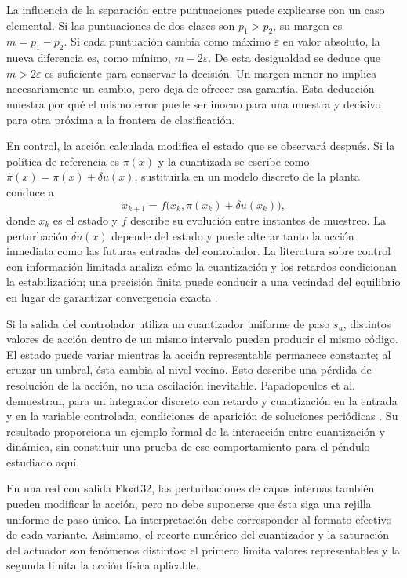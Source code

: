 La influencia de la separación entre puntuaciones puede explicarse con un caso elemental. Si las puntuaciones de dos clases son $p_1>p_2$, su margen es $m=p_1-p_2$. Si cada puntuación cambia como máximo $\varepsilon$ en valor absoluto, la nueva diferencia es, como mínimo, $m-2\varepsilon$. De esta desigualdad se deduce que $m>2\varepsilon$ es suficiente para conservar la decisión. Un margen menor no implica necesariamente un cambio, pero deja de ofrecer esa garantía. Esta deducción muestra por qué el mismo error puede ser inocuo para una muestra y decisivo para otra próxima a la frontera de clasificación.

En control, la acción calculada modifica el estado que se observará después. Si la política de referencia es $\pi(x)$ y la cuantizada se escribe como $\widehat\pi(x)=\pi(x)+\delta u(x)$, sustituirla en un modelo discreto de la planta conduce a
\begin{equation}
x_{k+1}=f\bigl(x_k,\pi(x_k)+\delta u(x_k)\bigr),
\label{eq:cap3_lazocerrado}
\end{equation}
donde $x_k$ es el estado y $f$ describe su evolución entre instantes de muestreo. La perturbación $\delta u(x)$ depende del estado y puede alterar tanto la acción inmediata como las futuras entradas del controlador. La literatura sobre control con información limitada analiza cómo la cuantización y los retardos condicionan la estabilización; una precisión finita puede conducir a una vecindad del equilibrio en lugar de garantizar convergencia exacta \cite{liberzon2009}.

Si la salida del controlador utiliza un cuantizador uniforme de paso $s_u$, distintos valores de acción dentro de un mismo intervalo pueden producir el mismo código. El estado puede variar mientras la acción representable permanece constante; al cruzar un umbral, ésta cambia al nivel vecino. Esto describe una pérdida de resolución de la acción, no una oscilación inevitable. Papadopoulos et al. demuestran, para un integrador discreto con retardo y cuantización en la entrada y en la variable controlada, condiciones de aparición de soluciones periódicas \cite{papadopoulos2018}. Su resultado proporciona un ejemplo formal de la interacción entre cuantización y dinámica, sin constituir una prueba de ese comportamiento para el péndulo estudiado aquí.

En una red con salida Float32, las perturbaciones de capas internas también pueden modificar la acción, pero no debe suponerse que ésta siga una rejilla uniforme de paso único. La interpretación debe corresponder al formato efectivo de cada variante. Asimismo, el recorte numérico del cuantizador y la saturación del actuador son fenómenos distintos: el primero limita valores representables y la segunda limita la acción física aplicable.

